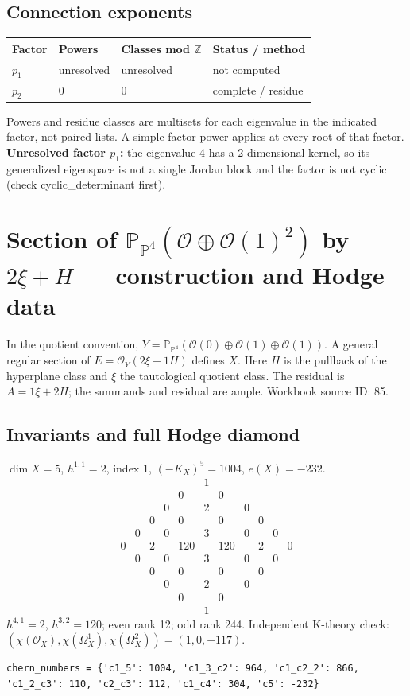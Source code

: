 \documentclass[10pt,a4paper]{article}
\begin{document}
\subsection*{Connection exponents}
\begin{center}\begin{tabular}{llll}\toprule Factor & Powers & Classes mod $\mathbb Z$ & Status / method\\\midrule
$p_{1}$ & unresolved & unresolved & not computed\\
$p_{2}$ & $0$ & $0$ & complete / residue\\
\bottomrule\end{tabular}\end{center}
Powers and residue classes are multisets for each eigenvalue in the indicated factor, not paired lists. A simple-factor power applies at every root of that factor.
\textbf{Unresolved factor $p_{1}$:} the eigenvalue 4 has a 2-dimensional kernel, so its generalized eigenspace is not a single Jordan block and the factor is not cyclic (check cyclic\_determinant first).
\clearpage\section*{Section of $\mathbb P_{\mathbb P^{4}}(\mathcal O\oplus \mathcal O(1)^{2})$ by $2\xi +H$ --- construction and Hodge data}\label{entry:PB5-085}
In the quotient convention, $Y=\mathbb P_{\mathbb P^{4}}(\mathcal O(0)\oplus\mathcal O(1)\oplus\mathcal O(1))$.
A general regular section of $E=\mathcal O_Y(2\xi+1H)$ defines $X$.
Here $H$ is the pullback of the hyperplane class and $\xi$ the tautological quotient class. The residual is $A=1\xi+2H$; the summands and residual are ample.
Workbook source ID: 85.
\subsection*{Invariants and full Hodge diamond}
$\dim X=5$, $h^{1,1}=2$, index $1$, $(-K_X)^5=1004$, $e(X)=-232$.
\[\begin{array}{ccccccccccc}&&&&&1&&&&&\\&&&&0&&0&&&&\\&&&0&&2&&0&&&\\&&0&&0&&0&&0&&\\&0&&0&&3&&0&&0&\\0&&2&&120&&120&&2&&0\\&0&&0&&3&&0&&0&\\&&0&&0&&0&&0&&\\&&&0&&2&&0&&&\\&&&&0&&0&&&&\\&&&&&1&&&&&\end{array}\]
$h^{4,1}=2$, $h^{3,2}=120$; even rank 12; odd rank 244.
Independent K-theory check: $(\chi(\mathcal O_X),\chi(\Omega_X^1),\chi(\Omega_X^2))=(1, 0, -117)$.
\begin{lstlisting}
chern_numbers = {'c1_5': 1004, 'c1_3_c2': 964, 'c1_c2_2': 866, 'c1_2_c3': 110, 'c2_c3': 112, 'c1_c4': 304, 'c5': -232}
\end{lstlisting}
\end{document}
